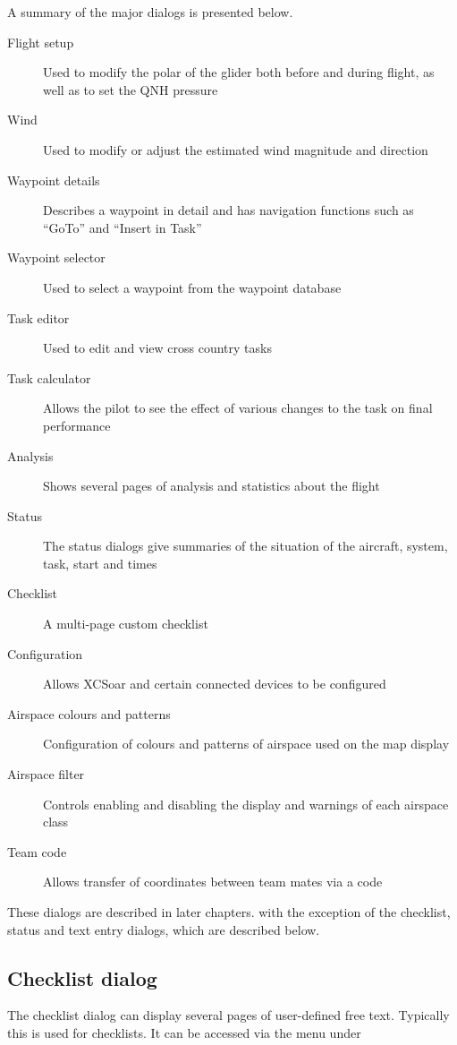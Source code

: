 \documentclass[a4paper,12pt]{refrep}
\begin{document}
 A summary of the
major dialogs is presented below.
\begin{description}
\item[Flight setup] Used to modify the polar of the glider both before and
during flight, as well as to set the QNH pressure
\item[Wind] Used to modify or adjust the estimated wind magnitude and direction
\item[Waypoint details] Describes a waypoint in detail and has navigation
functions such as ``GoTo'' and ``Insert in Task''
\item[Waypoint selector] Used to select a waypoint from the waypoint database
\item[Task editor] Used to edit and view cross country tasks
\item[Task calculator] Allows the pilot to see the effect of various changes to
the task on final performance
\item[Analysis] Shows several pages of analysis and statistics about the flight
\item[Status] The status dialogs give summaries of the situation of the 
aircraft, system, task, start and times
\item[Checklist] A multi-page custom checklist
\item[Configuration] Allows XCSoar and certain connected devices to be
configured
\item[Airspace colours and patterns] Configuration of colours and patterns of
airspace used on the map display
\item[Airspace filter] Controls enabling and disabling the display and warnings
of each airspace class
\item[Team code] Allows transfer of coordinates between team mates via a code
\end{description}

These dialogs are described in later chapters. with the exception of the
checklist, status and text entry dialogs, which are described below.

\subsection*{Checklist dialog}
The checklist dialog can display several pages of user-defined free text.
Typically this is used for checklists. It can be accessed via the menu under 
\begin{quote}
\blink{}
\end{quote}
\end{document}
